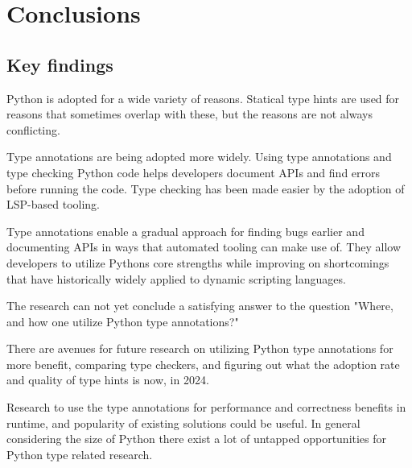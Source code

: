 \chapter{Conclusions\label{conclusions}}

\section{Key findings}
Python is adopted for a wide variety of reasons. Statical type hints are used for reasons that sometimes overlap with these, but the reasons are not always conflicting.

Type annotations are being adopted more widely. Using type annotations and type checking Python code helps developers document APIs and find errors before running the code. Type checking has been made easier by the adoption of LSP-based tooling. 

Type annotations enable a gradual approach for finding bugs earlier and documenting APIs in ways that automated tooling can make use of. They allow developers to utilize Pythons core strengths while improving on shortcomings that have historically widely applied to dynamic scripting languages.

The research can not yet conclude a satisfying answer to the question "Where, and how one utilize Python type annotations?"

There are avenues for future research on utilizing Python type annotations for more benefit, comparing type checkers, and figuring out what the adoption rate and quality of type hints is now, in 2024. 

 Research to use the type annotations for performance and correctness benefits in runtime, and popularity of existing solutions could be useful. In general considering the size of Python there exist a lot of untapped opportunities for Python type related research.